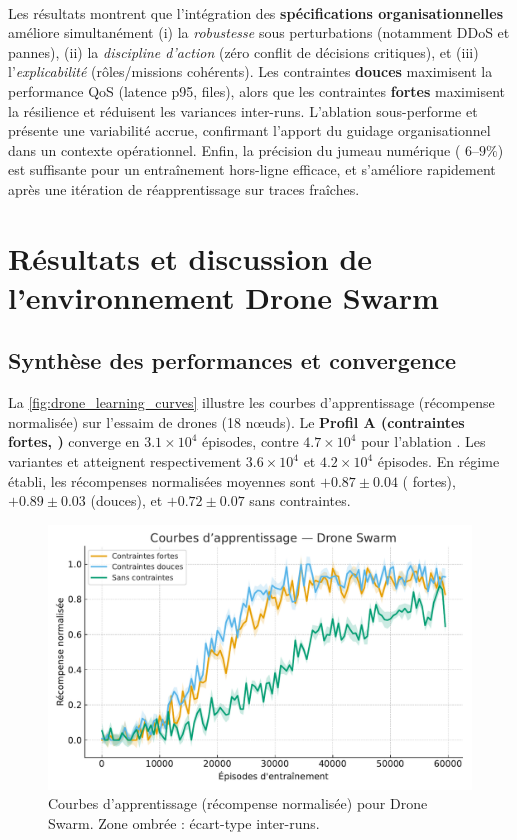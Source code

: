\

Les résultats montrent que l'intégration des \textbf{spécifications organisationnelles} améliore simultanément (i) la \emph{robustesse} sous perturbations (notamment DDoS et pannes), (ii) la \emph{discipline d'action} (zéro conflit de décisions critiques), et (iii) l'\emph{explicabilité} (rôles/missions cohérents).
Les contraintes \textbf{douces} maximisent la performance QoS (latence p95, files), alors que les contraintes \textbf{fortes} maximisent la résilience et réduisent les variances inter-runs.
L'ablation \texttt{} sous-performe et présente une variabilité accrue, confirmant l'apport du guidage organisationnel dans un contexte opérationnel.
Enfin, la précision du jumeau numérique ( $6$--$9\%$) est suffisante pour un entraînement hors-ligne efficace, et s'améliore rapidement après une itération de réapprentissage sur traces fraîches.


\section{Résultats et discussion de l'environnement \textbf{Drone Swarm}}\label{sec:results_and_discussion_drone_swarm}

\subsection*{Synthèse des performances et convergence}

La \autoref{fig:drone_learning_curves} illustre les courbes d'apprentissage (récompense normalisée) sur l'essaim de drones (18 nœuds).
Le \textbf{Profil A (contraintes fortes, )} converge en $3.1\times 10^4$ épisodes, contre $4.7\times 10^4$ pour l'ablation \texttt{}.
Les variantes  et  atteignent respectivement $3.6\times 10^4$ et $4.2\times 10^4$ épisodes.
En régime établi, les récompenses normalisées moyennes sont $+0.87 \pm 0.04$ ( fortes), $+0.89 \pm 0.03$ (douces), et $+0.72 \pm 0.07$ sans contraintes.

\begin{figure}[h!]
  \centering
  \includegraphics[width=0.75\linewidth]{figures/results_drone_learning.pdf}
  \caption[Courbes d'apprentissage (récompense normalisée) pour Drone Swarm]{Courbes d'apprentissage (récompense normalisée) pour Drone Swarm. Zone ombrée : écart-type inter-runs.}
  \label{fig:drone_learning_curves}
\end{figure}

